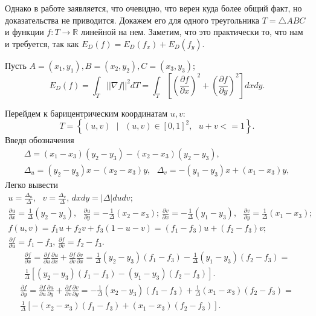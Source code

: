 Однако в работе \cite{Pinkall93} заявляется, что очевидно, что верен куда более общий факт, но доказательства не
приводится. Докажем его для одного треугольника $T = \triangle ABC$ и функции $f: T \to \mathbb{R}$ линейной
на нем. Заметим, что это практически то, что нам и требуется, так как $E_D(f) = E_D(f_x) + E_D(f_y)$. 

Пусть $A=(x_1, y_1), B=(x_2, y_2), C=(x_3, y_3)$; $$E_D(f) = \int_{T}{||\nabla{f}||^2 dT} = 
        \int_{T}{\left[\left(\frac{\partial f}{\partial x}\right)^2 + 
                       \left(\frac{\partial f}{\partial y}\right)^2 \right] dx dy}.$$ 

Перейдем к барицентрическим координатам $u, v$: $$T = \left\{(u, v)\mbox{ } | \mbox{ } (u, v) \in \left[0, 1 \right]^2 ,\mbox{ } u + v <= 1 \right\}.$$ 
Введя обозначения \begin{multline*} \Delta = (x_1 - x_3) (y_2 - y_3) - (x_2 - x_3) (y_2 - y_3), \\ \Delta_u = (y_2 - y_3) x - (x_2 - x_3) y, \mbox{ } \Delta_v = -(y_1 - y_3) x + (x_1 - x_3) y, 
\end{multline*}
Легко вывести
\begin{multline*} u = \frac{\Delta_u}{\Delta}, \mbox{ } v = \frac{\Delta_v}{\Delta} \mbox{, } dxdy = |\Delta| dudv; \\
        \frac{\partial u}{\partial x} = \frac{1}{\Delta}(y_2 - y_3), \mbox{ } \frac{\partial u}{\partial y} = -\frac{1}{\Delta}(x_2 - x_3) \mbox{; }
        \frac{\partial v}{\partial x} = -\frac{1}{\Delta}(y_1 - y_3), \mbox{ } \frac{\partial v}{\partial y} = \frac{1}{\Delta}(x_1 - x_3); \\
        f(u, v) = f_1 u + f_2 v + f_3(1-u-v) = (f_1 - f_3) u + (f_2 - f_3) v; \\
        \frac{\partial f}{\partial u} = f_1 - f_3 \mbox{, } \frac{\partial f}{\partial v} = f_2 - f_3. 
\end{multline*} 
 \begin{multline*}
        \frac{\partial f}{\partial x} = \frac{\partial f}{\partial u} \frac{\partial u}{\partial x} + \frac{\partial f}{\partial v} \frac{\partial v}{\partial x} = 
            \frac{1}{\Delta}(y_2 - y_3)(f_1 - f_3) - \frac{1}{\Delta}(y_1 - y_3)(f_2 - f_3) = \\
            \frac{1}{\Delta}\left[(y_2 - y_3)(f_1 - f_3) - (y_1 - y_3)(f_2 - f_3)\right]. 
    \end{multline*}
    \begin{multline*}
        \frac{\partial f}{\partial y} = \frac{\partial f}{\partial u} \frac{\partial u}{\partial y} + \frac{\partial f}{\partial v} \frac{\partial v}{\partial y} = 
            -\frac{1}{\Delta}(x_2 - y_3)(f_1 - f_3) + \frac{1}{\Delta}(x_1 - x_3)(f_2 - f_3) = \\
            \frac{1}{\Delta}\left[-(x_2 - x_3)(f_1 - f_3) + (x_1 - x_3)(f_2 - f_3)\right]. 
    \end{multline*}
